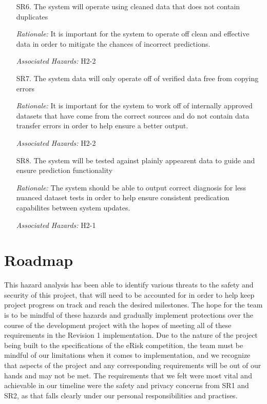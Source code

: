 \documentclass{article}
\begin{document}
\begin{enumerate}
    \item[SR6.] The system will operate using cleaned data that does not contain duplicates
	\item[] \emph{Rationale:} It is important for the system to operate off clean and effective data in order to mitigate the chances of incorrect predictions.
	\item[] \emph{Associated Hazards:} H2-2 \\
	
	\item[SR7.] The system data will only operate off of verified data free from copying errors
	\item[] \emph{Rationale:} It is important for the system to work off of internally approved datasets that have come from the correct sources and do not contain data transfer errors in order to help ensure a better output.
	\item[] \emph{Associated Hazards:} H2-2 \\

	\item[SR8.] The system will be tested against plainly appearent data to guide and ensure prediction functionality
	\item[] \emph{Rationale:} The system should be able to output correct diagnosis for less nuanced dataset tests in order to help ensure consistent predication capabilites between system updates.
	\item[] \emph{Associated Hazards:} H2-1 \\
    
\end{enumerate}

\section{Roadmap}

This hazard analysis has been able to identify various threats to the safety and security of this project, that will need to be accounted for in order to help keep project progress on track and reach the desired milestones. The hope for the team is to be mindful of these hazards and gradually implement protections over the course of the development project with the hopes of meeting all of these requirements in the Revision 1 implementation. Due to the nature of the project being built to the specifications of the eRisk competition, the team must be mindful of our limitations when it comes to implementation, and we recognize that aspects of the project and any corresponding requirements will be out of our hands and may not be met. The requirements that we felt were most vital and achievable in our timeline were the safety and privacy concerns from SR1 and SR2, as that falls clearly under our personal responsibilities and practises.
\end{document}
